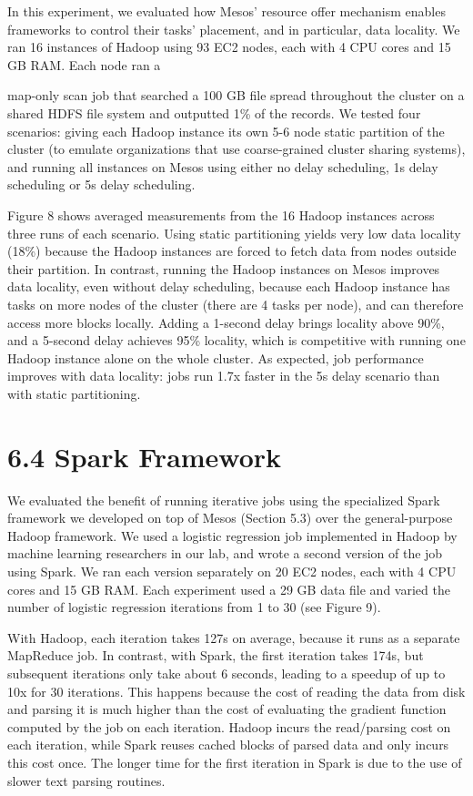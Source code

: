 \documentclass[
]{article}
\begin{document}
In this experiment, we evaluated how Mesos' resource offer mechanism
enables frameworks to control their tasks' placement, and in particular,
data locality. We ran 16 instances of Hadoop using 93 EC2 nodes, each
with 4 CPU cores and 15 GB RAM. Each node ran a

map-only scan job that searched a 100 GB file spread throughout the
cluster on a shared HDFS file system and outputted 1\% of the records.
We tested four scenarios: giving each Hadoop instance its own 5-6 node
static partition of the cluster (to emulate organizations that use
coarse-grained cluster sharing systems), and running all instances on
Mesos using either no delay scheduling, 1s delay scheduling or 5s delay
scheduling.

Figure 8 shows averaged measurements from the 16 Hadoop instances across
three runs of each scenario. Using static partitioning yields very low
data locality (18\%) because the Hadoop instances are forced to fetch
data from nodes outside their partition. In contrast, running the Hadoop
instances on Mesos improves data locality, even without delay
scheduling, because each Hadoop instance has tasks on more nodes of the
cluster (there are 4 tasks per node), and can therefore access more
blocks locally. Adding a 1-second delay brings locality above 90\%, and
a 5-second delay achieves 95\% locality, which is competitive with
running one Hadoop instance alone on the whole cluster. As expected, job
performance improves with data locality: jobs run 1.7x faster in the 5s
delay scenario than with static partitioning.

\section{6.4 Spark Framework}\label{spark-framework-1}

We evaluated the benefit of running iterative jobs using the specialized
Spark framework we developed on top of Mesos (Section 5.3) over the
general-purpose Hadoop framework. We used a logistic regression job
implemented in Hadoop by machine learning researchers in our lab, and
wrote a second version of the job using Spark. We ran each version
separately on 20 EC2 nodes, each with 4 CPU cores and 15 GB RAM. Each
experiment used a 29 GB data file and varied the number of logistic
regression iterations from 1 to 30 (see Figure 9).

With Hadoop, each iteration takes 127s on average, because it runs as a
separate MapReduce job. In contrast, with Spark, the first iteration
takes 174s, but subsequent iterations only take about 6 seconds, leading
to a speedup of up to 10x for 30 iterations. This happens because the
cost of reading the data from disk and parsing it is much higher than
the cost of evaluating the gradient function computed by the job on each
iteration. Hadoop incurs the read/parsing cost on each iteration, while
Spark reuses cached blocks of parsed data and only incurs this cost
once. The longer time for the first iteration in Spark is due to the use
of slower text parsing routines.
\end{document}

